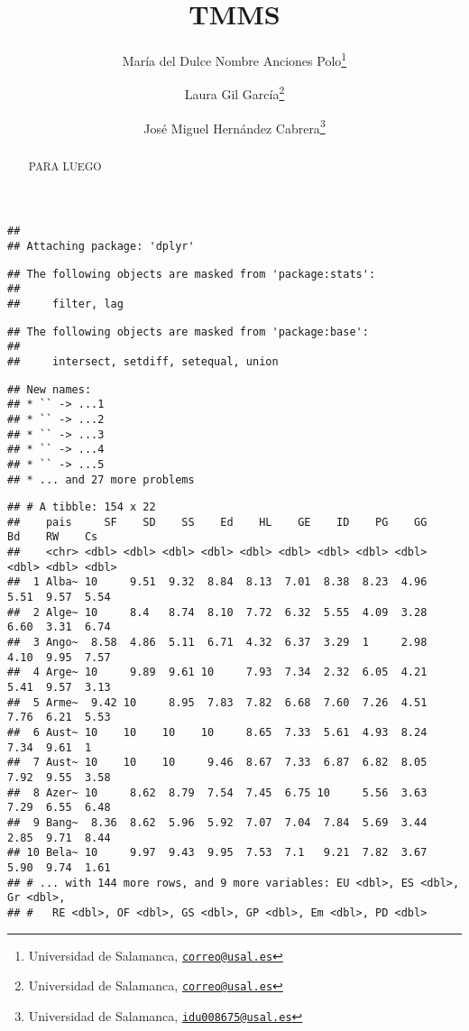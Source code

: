 \documentclass[
  10pt,
  spanish,
]{article}
\title{TMMS}
\author{María del Dulce Nombre Anciones Polo\footnote{Universidad de Salamanca,
  \href{mailto:correo@usal.es}{\nolinkurl{correo@usal.es}}} \and Laura Gil García\footnote{Universidad de Salamanca,
  \href{mailto:correo@usal.es}{\nolinkurl{correo@usal.es}}} \and José Miguel Hernández Cabrera\footnote{Universidad de Salamanca,
  \href{mailto:idu008675@usal.es}{\nolinkurl{idu008675@usal.es}}}}
\date{}
\begin{document}
\maketitle
\begin{abstract}
PARA LUEGO
\end{abstract}

\begin{verbatim}
## 
## Attaching package: 'dplyr'
\end{verbatim}

\begin{verbatim}
## The following objects are masked from 'package:stats':
## 
##     filter, lag
\end{verbatim}

\begin{verbatim}
## The following objects are masked from 'package:base':
## 
##     intersect, setdiff, setequal, union
\end{verbatim}

\begin{verbatim}
## New names:
## * `` -> ...1
## * `` -> ...2
## * `` -> ...3
## * `` -> ...4
## * `` -> ...5
## * ... and 27 more problems
\end{verbatim}

\begin{verbatim}
## # A tibble: 154 x 22
##    pais     SF    SD    SS    Ed    HL    GE    ID    PG    GG    Bd    RW    Cs
##    <chr> <dbl> <dbl> <dbl> <dbl> <dbl> <dbl> <dbl> <dbl> <dbl> <dbl> <dbl> <dbl>
##  1 Alba~ 10     9.51  9.32  8.84  8.13  7.01  8.38  8.23  4.96  5.51  9.57  5.54
##  2 Alge~ 10     8.4   8.74  8.10  7.72  6.32  5.55  4.09  3.28  6.60  3.31  6.74
##  3 Ango~  8.58  4.86  5.11  6.71  4.32  6.37  3.29  1     2.98  4.10  9.95  7.57
##  4 Arge~ 10     9.89  9.61 10     7.93  7.34  2.32  6.05  4.21  5.41  9.57  3.13
##  5 Arme~  9.42 10     8.95  7.83  7.82  6.68  7.60  7.26  4.51  7.76  6.21  5.53
##  6 Aust~ 10    10    10    10     8.65  7.33  5.61  4.93  8.24  7.34  9.61  1   
##  7 Aust~ 10    10    10     9.46  8.67  7.33  6.87  6.82  8.05  7.92  9.55  3.58
##  8 Azer~ 10     8.62  8.79  7.54  7.45  6.75 10     5.56  3.63  7.29  6.55  6.48
##  9 Bang~  8.36  8.62  5.96  5.92  7.07  7.04  7.84  5.69  3.44  2.85  9.71  8.44
## 10 Bela~ 10     9.97  9.43  9.95  7.53  7.1   9.21  7.82  3.67  5.90  9.74  1.61
## # ... with 144 more rows, and 9 more variables: EU <dbl>, ES <dbl>, Gr <dbl>,
## #   RE <dbl>, OF <dbl>, GS <dbl>, GP <dbl>, Em <dbl>, PD <dbl>
\end{verbatim}
\end{document}
